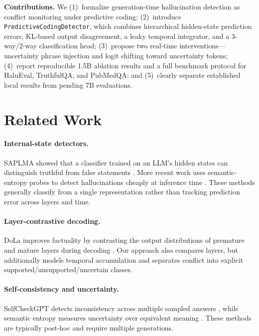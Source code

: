 \documentclass[letterpaper]{article}
\begin{document}
\textbf{Contributions.} We (1)~formalize generation-time hallucination detection as conflict monitoring under predictive coding; (2)~introduce \texttt{PredictiveCodingDetector}, which combines hierarchical hidden-state prediction errors, KL-based output disagreement, a leaky temporal integrator, and a 3-way/2-way classification head; (3)~propose two real-time interventions---uncertainty phrase injection and logit shifting toward uncertainty tokens; (4)~report reproducible 1.5B ablation results and a full benchmark protocol for HaluEval, TruthfulQA, and PubMedQA; and (5)~clearly separate established local results from pending 7B evaluations.

\section{Related Work}

\paragraph{Internal-state detectors.} SAPLMA showed that a classifier trained on an LLM's hidden states can distinguish truthful from false statements \cite{azaria2023saplma}. More recent work uses semantic-entropy probes to detect hallucinations cheaply at inference time \cite{kossen2024seps}. These methods generally classify from a single representation rather than tracking prediction error across layers and time.

\paragraph{Layer-contrastive decoding.} DoLa improves factuality by contrasting the output distributions of premature and mature layers during decoding \cite{chuang2024dola}. Our approach also compares layers, but additionally models temporal accumulation and separates conflict into explicit supported/unsupported/uncertain classes.

\paragraph{Self-consistency and uncertainty.} SelfCheckGPT detects inconsistency across multiple sampled answers \cite{miao2023selfcheckgpt}, while semantic entropy measures uncertainty over equivalent meaning \cite{kuhn2023semantic, farquhar2024detecting}. These methods are typically post-hoc and require multiple generations.
\end{document}
